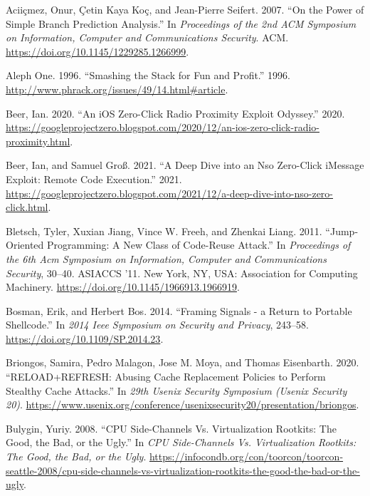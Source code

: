 \documentclass[a4paper,]{report}
\begin{document}
\leavevmode\hypertarget{ref-Aciicmez2007}{}%
Aciiçmez, Onur, Çetin Kaya Koç, and Jean-Pierre Seifert. 2007. ``On the
Power of Simple Branch Prediction Analysis.'' In \emph{Proceedings of
the 2nd ACM Symposium on Information, Computer and Communications
Security}. ACM. \url{https://doi.org/10.1145/1229285.1266999}.

\leavevmode\hypertarget{ref-AlephOne1996}{}%
Aleph One. 1996. ``Smashing the Stack for Fun and Profit.'' 1996.
\url{http://www.phrack.org/issues/49/14.html\#article}.

\leavevmode\hypertarget{ref-Beer2020}{}%
Beer, Ian. 2020. ``An iOS Zero-Click Radio Proximity Exploit Odyssey.''
2020.
\url{https://googleprojectzero.blogspot.com/2020/12/an-ios-zero-click-radio-proximity.html}.

\leavevmode\hypertarget{ref-Beer2021}{}%
Beer, Ian, and Samuel Groß. 2021. ``A Deep Dive into an Nso Zero-Click
iMessage Exploit: Remote Code Execution.'' 2021.
\url{https://googleprojectzero.blogspot.com/2021/12/a-deep-dive-into-nso-zero-click.html}.

\leavevmode\hypertarget{ref-Bletsch2011}{}%
Bletsch, Tyler, Xuxian Jiang, Vince W. Freeh, and Zhenkai Liang. 2011.
``Jump-Oriented Programming: A New Class of Code-Reuse Attack.'' In
\emph{Proceedings of the 6th Acm Symposium on Information, Computer and
Communications Security}, 30--40. ASIACCS '11. New York, NY, USA:
Association for Computing Machinery.
\url{https://doi.org/10.1145/1966913.1966919}.

\leavevmode\hypertarget{ref-Bosman2014}{}%
Bosman, Erik, and Herbert Bos. 2014. ``Framing Signals - a Return to
Portable Shellcode.'' In \emph{2014 Ieee Symposium on Security and
Privacy}, 243--58. \url{https://doi.org/10.1109/SP.2014.23}.

\leavevmode\hypertarget{ref-Briongos2020}{}%
Briongos, Samira, Pedro Malagon, Jose M. Moya, and Thomas Eisenbarth.
2020. ``RELOAD+REFRESH: Abusing Cache Replacement Policies to Perform
Stealthy Cache Attacks.'' In \emph{29th Usenix Security Symposium
(Usenix Security 20)}.
\url{https://www.usenix.org/conference/usenixsecurity20/presentation/briongos}.

\leavevmode\hypertarget{ref-Bulygin2008}{}%
Bulygin, Yuriy. 2008. ``CPU Side-Channels Vs. Virtualization Rootkits:
The Good, the Bad, or the Ugly.'' In \emph{CPU Side-Channels Vs.
Virtualization Rootkits: The Good, the Bad, or the Ugly}.
\url{https://infocondb.org/con/toorcon/toorcon-seattle-2008/cpu-side-channels-vs-virtualization-rootkits-the-good-the-bad-or-the-ugly}.
\end{document}
